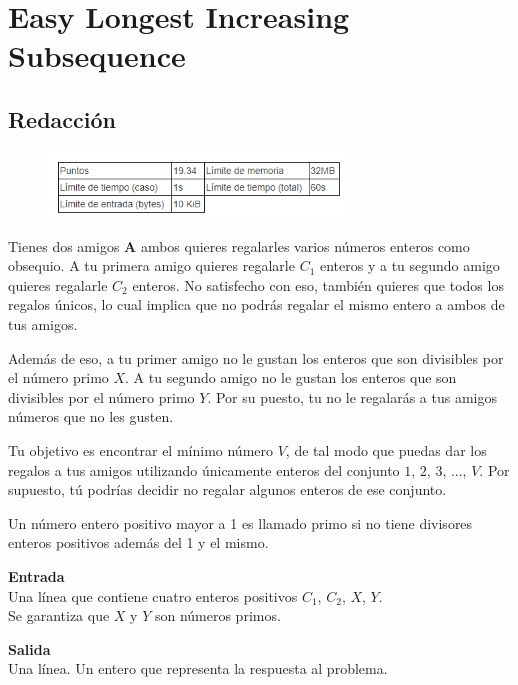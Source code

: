 \documentclass[12pt]{article}
\begin{document}
  \section{Easy Longest Increasing Subsequence}
  
    \subsection{Redacción}
        \begin{figure}[h!]
	        \centering
	        \includegraphics[width=0.7\textwidth]{Abigail/Ejercicio06/Images/2_B.PNG}
	 	\end{figure} 

        Tienes dos amigos \textbf{A} ambos quieres regalarles varios números enteros como obsequio. A tu primera amigo quieres regalarle $C_{1}$ enteros y a tu segundo amigo quieres regalarle $C_{2}$ enteros. No satisfecho con eso, también quieres que todos los regalos únicos, lo cual implica que no podrás regalar el mismo entero a ambos de tus amigos.
        
        Además de eso, a tu primer amigo no le gustan los enteros que son divisibles por el número primo $X$. A tu segundo amigo no le gustan los enteros que son divisibles por el número primo $Y$. Por su puesto, tu no le regalarás a tus amigos números que no les gusten.
        
        Tu objetivo es encontrar el mínimo número $V$, de tal modo que puedas dar los regalos a tus amigos utilizando únicamente enteros del conjunto $1$, $2$, $3$, ..., $V$. Por supuesto, tú podrías decidir no regalar algunos enteros de ese conjunto.
        
        Un número entero positivo mayor a 1 es llamado primo si no tiene divisores enteros positivos además del 1 y el mismo.
        
        \begin{multicols}{2}
            \noindent\textbf{Entrada} \\ 
            Una línea que contiene cuatro enteros positivos $C_{1}$, $C_{2}$, $X$, $Y$.     \\
            Se garantiza que $X$ y $Y$ son números primos.
            
        \columnbreak
            
            \noindent\textbf{Salida} \\
            Una línea. Un entero que representa la respuesta al problema.
        \end{multicols}
        
\end{document}

